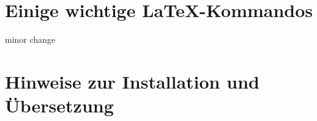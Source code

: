 \setcounter{page}{7}

\chapter{Einige wichtige \LaTeX{}-Kommandos}

minor change









\chapter{Hinweise zur Installation und \"Ubersetzung}



\newpage
\sePrintGlossary{}


\sePrintBibliography{}






\seEhrenwoertlicheErklaerung{}

